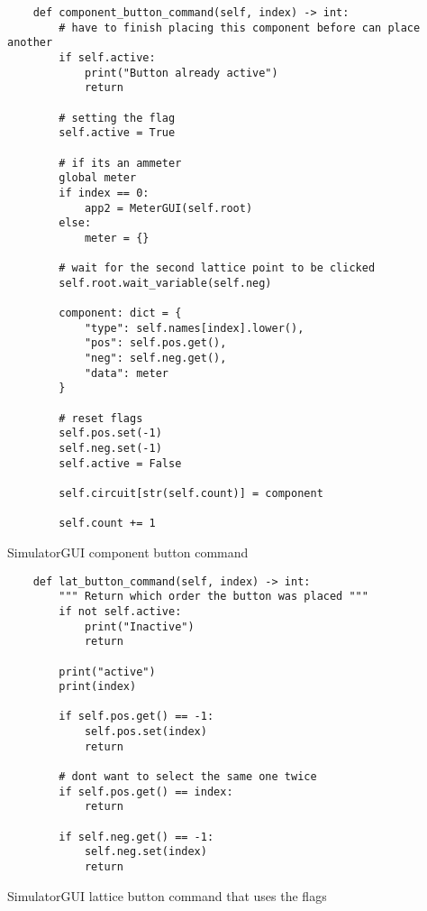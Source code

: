 \newpage
\begin{listing}[!ht]
    \begin{verbatim}
    def component_button_command(self, index) -> int:
        # have to finish placing this component before can place another
        if self.active:
            print("Button already active")
            return
        
        # setting the flag
        self.active = True
        
        # if its an ammeter
        global meter
        if index == 0:
            app2 = MeterGUI(self.root)
        else:
            meter = {}
        
        # wait for the second lattice point to be clicked
        self.root.wait_variable(self.neg)
        
        component: dict = {
            "type": self.names[index].lower(),
            "pos": self.pos.get(),
            "neg": self.neg.get(),
            "data": meter
        }
        
        # reset flags
        self.pos.set(-1)
        self.neg.set(-1)
        self.active = False
        
        self.circuit[str(self.count)] = component
        
        self.count += 1
    \end{verbatim}
    \caption{SimulatorGUI component button command}
    \label{sc:simgui-comp-btn-cmd}
\end{listing}


\newpage
\begin{listing}[!ht]
    \begin{verbatim}
    def lat_button_command(self, index) -> int:
        """ Return which order the button was placed """
        if not self.active:
            print("Inactive")
            return
        
        print("active")
        print(index)
        
        if self.pos.get() == -1:
            self.pos.set(index)
            return
        
        # dont want to select the same one twice
        if self.pos.get() == index:
            return
        
        if self.neg.get() == -1:
            self.neg.set(index)
            return
    \end{verbatim}
    \caption{SimulatorGUI lattice button command that uses the flags}
    \label{sc:simgui-lattice-btn-command-real}
\end{listing}

